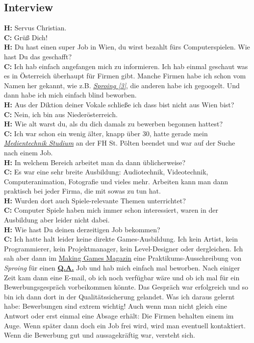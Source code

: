 \subsection*{Interview}
\textbf{H:} Servus Christian. \\
\textbf{C:} Grüß Dich! \\
\textbf{H:} Du hast einen super Job in Wien, du wirst bezahlt fürs Computerspielen. Wie hast Du das geschafft? \\
\textbf{C:} Ich hab einfach angefangen mich zu informieren. Ich hab einmal geschaut was es in Österreich überhaupt für Firmen gibt. Manche Firmen habe ich schon vom Namen her gekannt, wie z.B. \href{https://www.sproing.at/}{\textit{Sproing [3]}}, die anderen habe ich gegoogelt. Und dann habe ich mich einfach blind beworben. \\
\textbf{H:} Aus der Diktion deiner Vokale schließe ich dass bist nicht aus Wien bist? \\
\textbf{C:} Nein, ich bin aus Niederösterreich. \\
\textbf{H:} Wie alt warst du, als du dich damals zu bewerben begonnen hattest? \\
\textbf{C:} Ich war schon ein wenig älter, knapp über 30, hatte gerade mein \href{http://www.fhstp.ac.at/studienangebot/bachelor/mt}{\textit{Medientechnik Studium}} an der FH St. Pölten beendet und war auf der Suche nach einem Job. \\
\textbf{H:} In welchem Bereich arbeitet man da dann üblicherweise? \\
\textbf{C:} Es war eine sehr breite Ausbildung: Audiotechnik, Videotechnik, Computeranimation, Fotografie und vieles mehr. Arbeiten kann man dann praktisch bei jeder Firma, die mit sowas zu tun hat. \\
\textbf{H:} Wurden dort auch Spiele-relevante Themen unterrichtet? \\
\textbf{C:} Computer Spiele haben mich immer schon interessiert, waren in der 
Ausbildung aber leider nicht dabei. \\
\textbf{H:} Wie hast Du deinen derzeitigen Job bekommen? \\
\textbf{C:} Ich hatte halt leider keine direkte Games-Ausbildung. Ich kein Artist, kein Programmierer, kein Projektmanager, kein Level-Designer oder dergleichen. Ich sah aber dann im \href{http://www.makinggames.de/}{Making Games Magazin} eine Praktikums-Ausschreibung von \textit{Sproing} für einen \href{https://de.wikipedia.org/wiki/Quality_Assurance}{\textbf{Q.A.}} Job und hab mich einfach mal beworben. Nach einiger Zeit kam dann eine E-mail, ob ich noch verfügbar wäre und ob ich mal für ein Bewerbungsgespräch vorbeikommen könnte. Das Gespräch war erfolgreich und so bin ich dann dort in der Qualitätssicherung gelandet. Was ich daraus gelernt habe:  Bewerbungen sind extrem wichtig! Auch wenn man nicht gleich eine Antwort oder erst einmal eine Absage erhält: Die Firmen behalten einem im Auge. Wenn später dann doch ein Job frei wird, wird man eventuell kontaktiert. Wenn die Bewerbung gut und aussagekräftig war, versteht sich. \\
